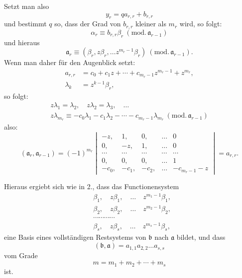 \documentclass{article}
\begin{document}
Setzt man also
\[ y_{r} = qa_{r,r} + b_{r,r} \]
und bestimmt $q$ so, dass der Grad von $b_{r,r}$ kleiner als $m_{r}$ wird, so folgt:
\[ \alpha_{r} \equiv b_{r,r}\beta_{r} \ (\text{mod.}\,\mathfrak{a}_{r-1}) \]
und hieraus
\[ \mathfrak{a}_{r} \equiv (\beta_{r}, z\beta_{r}, \ldots z^{m_{r}-1}\beta_{r}) \ (\text{mod.}\,\mathfrak{a}_{r-1}). \]
Wenn man daher für den Augenblick setzt:
\[ \begin{aligned} a_{r,r} &= c_{0} + c_{1}z + \cdots + c_{m_{r}-1}z^{m_{r}-1} + z^{m_{r}}, \\ \lambda_{k} &= z^{k-1}\beta_{r}, \end{aligned} \]
so folgt:
\[ \begin{gathered} z\lambda_{1} = \lambda_{2}, \quad z\lambda_{2} = \lambda_{3}, \quad \ldots \\ z\lambda_{m_{r}} \equiv -c_{0}\lambda_{1} - c_{1}\lambda_{2} - \cdots - c_{m_{r}-1}\lambda_{m_{r}} \ (\text{mod.}\,\mathfrak{a}_{r-1}) \end{gathered} \]
also:
\[ (\mathfrak{a}_{r}, \mathfrak{a}_{r-1}) = (-1)^{m_{r}} \begin{vmatrix} -z, & 1, & 0, & \ldots & 0 \\ 0, & -z, & 1, & \ldots & 0 \\ \cdots & \cdots & \cdots & \cdots & \cdots \\ 0, & 0, & 0, & \ldots & 1 \\ -c_{0}, & -c_{1}, & -c_{2}, & \ldots & -c_{m_{r}-1}-z \end{vmatrix} = a_{r,r}. \]

Hieraus ergiebt sich wie in 2., dass das Functionensystem
\[ \begin{aligned} &\beta_{1}, \quad z\beta_{1}, \quad \ldots \quad z^{m_{1}-1}\beta_{1}, \\ &\beta_{2}, \quad z\beta_{2}, \quad \ldots \quad z^{m_{2}-1}\beta_{2}, \\ &\cdots\cdots\cdots\cdots \\ &\beta_{s}, \quad z\beta_{s}, \quad \ldots \quad z^{m_{s}-1}\beta_{s}, \end{aligned} \]
eine Basis eines vollständigen Restsystems von $\mathfrak{b}$ nach $\mathfrak{a}$ bildet, und dass
\[ (\mathfrak{b}, \mathfrak{a}) = a_{1,1}a_{2,2}\ldots a_{s,s} \]
vom Grade
\[ m = m_{1} + m_{2} + \cdots + m_{s} \]
ist.
\end{document}
